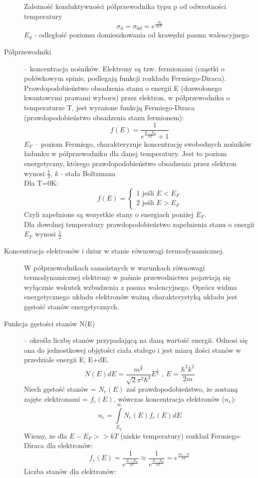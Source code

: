 \documentclass[a4paper,11pt]{article}
\begin{document}
\begin{description}
  Zależność konduktywności półprzewodnika typu p od odwrotności temperatury
  $$\sigma_d=\sigma_{0d}=e^{\frac{-E_d}{2kT}}$$
  $E_d$ - odległość poziomu domieszkowania od krawędzi pasma walencyjnego
\item[Półprzewodniki] -- koncentracja nośników. Elektrony są tzw. fermionami (cząstki o połówkowym spinie, podlegają funkcji rozkładu Fermiego-Diraca).\\
  Prawdopodobieństwo obsadzenia stanu o energii E (dozwolonego kwantowymi prawami wyboru) przez elektron, w półprzewodniku o temperaturze T, jest wyrażone funkcją Fermiego-Diraca (prawdopodobieństwo obsadzenia stanu fermionem):
  $$f(E)=\frac{1}{e^\frac{E-E_F}{kT}+1}$$
  $E_F$ -- poziom Fermiego, charakteryzuje koncentrację swobodnych nośników ładunku w półprzewodniku dla danej temperatury. Jest to poziom energetyczny, którego prawdopodobieństwo obsadzenia przez elektron wynosi $\frac{1}{2}$, $k$ - stała Boltzmana\\
  Dla T=0K:
  $$f(E)=\left\{\begin{array}{l}1\text{      jeśli }E<E_F \\ 2\text{      jeśli }E>E_F \end{array}\right.$$
  Czyli zapełnione są wszystkie stany o energiach poniżej $E_F$.\\
  Dla dowolnej temperatury prawdopodobieństwo zapełnienia stanu o energii $E_F$ wynosi $\frac{1}{2}$
\item[Koncentracja elektronów i dziur w stanie równowagi termodynamicznej.] W półprzewodnikach samoistnych w warunkach równowagi termodynamicznej elektrony w paśmie przewodnictwa pojawiają się wyłącznie wskutek wzbudzenia z pasma walencyjnego. Oprócz widma energetycznego układu elektronów ważną charakterystyką układu jest gęstość stanów energetycznych.
\item[Funkcja gęstości stanów N(E)] -- określa liczbę stanów przypadającą na daną wartość energii. Odnosi się ona do jednostkowej objętości ciała stałego i jest miarą ilości stanów w przedziale energii E, E+dE.
  $$N(E)dE=\frac{m^\frac{3}{2}}{\sqrt{2}\pi^2\hbar^3}E^\frac{1}{2}\text{   ,  }E=\frac{\hbar^2k^2}{2m}$$
  Niech gęstość stanów = $N_e(E)$ zaś prawdopodobieństwo, że zostaną zajęte elektronami = $f_e(E)$, wówczas koncentracja elektronów ($n_e$):
  $$n_e=\int\limits^\infty_{E_g}N_e(E)f_e(E)dE$$
  Wiemy, że dla $E-E_F>>kT$ (niskie temperatury) rozkład Fermiego-Diraca dla elektronów:
  $$f_e(E)=\frac{1}{e^\frac{E-E_F}{kT}}\approx \frac{1}{e^\frac{E-E_F}{kT}}=e^\frac{E_F-E}{kT}$$
  Liczba stanów dla elektronów:

\end{description}
\end{document}
